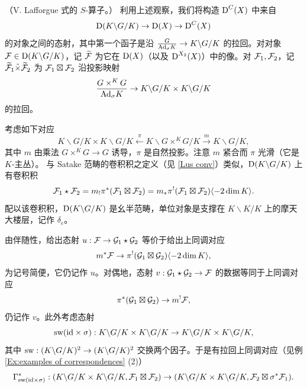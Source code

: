 \begin{construction}
\label{Con: S}
（V. Lafforgue 式的 $S$-算子。）
利用上述观察，我们将构造 $\operatorname{D}^C(X)$ 中来自
\[\operatorname{D}(K\backslash G/K)\to \operatorname{D}(X)\to\operatorname{D}^{C}(X)\]
的对象之间的态射，其中第一个函子是沿 $\frac{G}{{\operatorname{Ad}}_\sigma K}\to K\backslash G/K$ 的拉回。对对象 ${\mathcal F}\in \operatorname{D}(K\backslash G/K)$，记 $\widetilde{{\mathcal F}}$ 为它在 $\operatorname{D}(X)$（以及 $\operatorname{D}^{X_2}(X)$）中的像。对 ${\mathcal F}_1,{\mathcal F}_2$，记
$\widetilde{{\mathcal F}}_1\tilde\times\widetilde{{\mathcal F}}_2$ 为 ${\mathcal F}_1\boxtimes{\mathcal F}_2$ 沿投影映射
$$\frac{G\times^KG}{{\operatorname{Ad}}_\sigma K}\to K\backslash G/K\times K\backslash G/K$$
的拉回。

考虑如下对应
\begin{equation*}
\label{E:Conv corr}
K\backslash G/K\times K\backslash G/K\xleftarrow{\pi} K\backslash G\times^KG/K\xrightarrow{m} K\backslash G/K,
\end{equation*}
其中 $m$ 由乘法 $G\times^K G\to G$ 诱导，$\pi$ 是自然投影。注意 $m$ 紧合而 $\pi$ 光滑（它是 $K$-主丛）。
与 Satake 范畴的卷积积之定义（见 \eqref{Lus conv}）类似，$\operatorname{D}(K\backslash G/K)$ 上有卷积积
\begin{equation}
\label{Lus conv2}
{\mathcal F}_1\star {\mathcal F}_2=m_!\pi^*({\mathcal F}_1\boxtimes{\mathcal F}_2)=m_*\pi^!({\mathcal F}_1\boxtimes{\mathcal F}_2)\langle-2\dim K\rangle.
\end{equation}
配以该卷积积，$\operatorname{D}(K\backslash G/K)$ 是幺半范畴，单位对象是支撑在 $K\backslash K/K$ 上的摩天大楼层，记作 $\delta_e$。

由伴随性，给出态射 $u: {\mathcal F}\to {\mathcal G}_1\star {\mathcal G}_2$ 等价于给出上同调对应
\begin{equation*}
\label{E: creation corr}
m^*{\mathcal F}\to\pi^!({\mathcal G}_1\boxtimes{\mathcal G}_2)\langle-2\dim K\rangle,
\end{equation*}
为记号简便，它仍记作 $u$。对偶地，态射 $v:{\mathcal G}_1\star{\mathcal G}_2\to {\mathcal F}$ 的数据等同于上同调对应
\begin{equation*}
\label{E: ann corr}
\pi^*({\mathcal G}_1\boxtimes{\mathcal G}_2)\to m^!{\mathcal F},
\end{equation*}
仍记作 $v$。此外考虑态射
\[\operatorname{sw}({\operatorname{id}}\times \sigma): K\backslash G/K\times K\backslash G/K\to K\backslash G/K\times K\backslash G/K,\]
其中 $\operatorname{sw}: (K\backslash G/K)^2\to (K\backslash G/K)^2$ 交换两个因子。于是有拉回上同调对应（见例 \ref{Ex:examples of correspondences} (2)）
\begin{equation}
\label{E: Frob corr}
\Gamma_{\operatorname{sw}({\operatorname{id}}\times\sigma)}^*: (K\backslash G/K\times K\backslash G/K, {\mathcal F}_1\boxtimes {\mathcal F}_2)\to (K\backslash G/K\times K\backslash G/K, {\mathcal F}_2\boxtimes \sigma^*{\mathcal F}_1).
\end{equation}


\end{construction}
